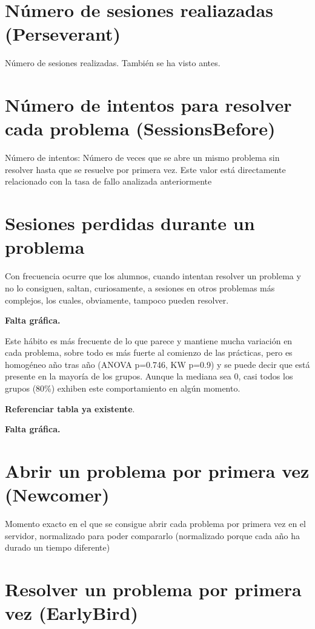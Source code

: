 \section{Número de sesiones realiazadas (Perseverant)}

Número de sesiones realizadas. También se ha visto antes.

\section{Número de intentos para resolver cada problema (SessionsBefore)}

Número de intentos: Número de veces que se abre un mismo problema sin resolver hasta que se resuelve por primera vez. Este valor está directamente relacionado con la tasa de fallo analizada anteriormente

\section{Sesiones perdidas durante un problema}

Con frecuencia ocurre que los alumnos, cuando intentan resolver un problema y no lo consiguen, saltan, curiosamente, a sesiones en otros problemas más complejos, los cuales, obviamente, tampoco pueden resolver.

\textbf{Falta gráfica.}

Este hábito es más frecuente de lo que parece y mantiene mucha variación en cada problema, sobre todo es más fuerte al comienzo de las prácticas, pero es homogéneo año tras año (ANOVA p=0.746, KW p=0.9) y se puede decir que está presente en la mayoría de los grupos. Aunque la mediana sea 0, casi todos los grupos (80\%) exhiben este comportamiento en algún momento.

\textbf{Referenciar tabla ya existente}.

\textbf{Falta gráfica.}

\section{Abrir un problema por primera vez (Newcomer)}

Momento exacto en el que se consigue abrir cada problema por primera vez en el servidor, normalizado para poder compararlo (normalizado porque cada año ha durado  un tiempo diferente)

\section{Resolver un problema por primera vez (EarlyBird)}

